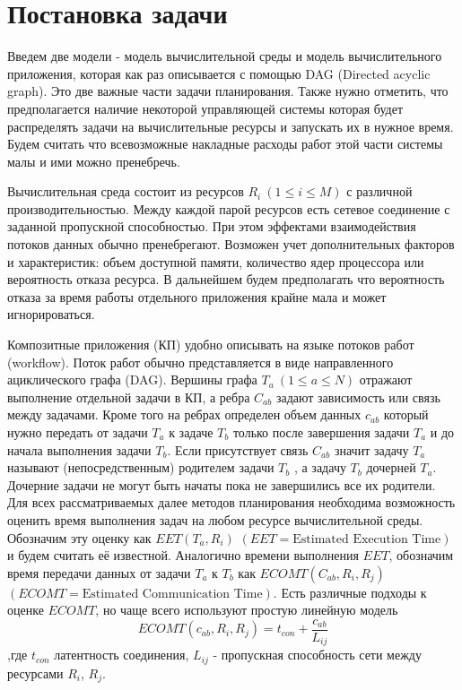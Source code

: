 \chapter*{Постановка задачи}
\begin{spacing}{1.4}

Введем две модели - модель вычислительной среды и модель вычислительного приложения, которая как раз описывается с помощью DAG (Directed acyclic graph). Это две важные части задачи планирования. Также нужно отметить, что предполагается наличие некоторой управляющей системы которая будет распределять задачи на вычислительные ресурсы и запускать их в нужное время. Будем считать что всевозможные накладные расходы работ этой части системы малы и ими можно пренебречь.

Вычислительная среда состоит из ресурсов $R_i~(1 \leq i \leq M)$ с различной производительностью. Между каждой парой ресурсов есть сетевое соединение с заданной пропускной способностью. При этом эффектами взаимодействия потоков данных обычно пренебрегают. Возможен учет дополнительных факторов и характеристик: объем доступной памяти, количество ядер процессора или вероятность отказа ресурса. В дальнейшем будем предполагать что вероятность отказа за время работы отдельного приложения крайне мала и может игнорироваться.

Композитные приложения (КП) удобно описывать на языке потоков работ (workflow). Поток работ обычно представляется в виде направленного ациклического графа (DAG). Вершины графа $T_a~(1 \leq a \leq N) $ отражают  выполнение отдельной задачи в КП, а ребра $C_{ab}$ задают зависимость или связь между задачами. Кроме того на ребрах определен объем данных $c_{ab}$ который нужно передать от задачи $T_a$  к задаче $T_b$ только после завершения задачи $T_a$ и до начала выполнения задачи $T_b$.  Если присутствует связь $C_{ab}$ значит задачу  $T_a$ называют (непосредственным) родителем задачи  $T_b$ , а задачу $T_b$ дочерней   $T_a$. Дочерние задачи не могут быть начаты пока не завершились все их родители. Для всех рассматриваемых далее методов планирования необходима возможность оценить время выполнения задач на любом ресурсе вычислительной среды. Обозначим эту оценку как $EET(T_a, R_i)$ $(EET = \text{Estimated Execution Time})$ и будем считать её известной. Аналогично времени выполнения $EET$, обозначим время передачи данных от задачи $T_a$ к $T_b$ как $ECOMT(C_{ab}, R_i, R_j)$ $(ECOMT = \text{Estimated Communication Time})$. Есть различные подходы к оценке $ECOMT$, но чаще всего используют простую линейную модель $$ECOMT (c_{ab}, R_i, R_j) = t_{con} + \frac{c_{ab}}{L_{ij}}$$
,где $t_{con}$ латентность соединения, $L_{ij}$ - пропускная способность сети между ресурсами $R_i$, $R_j$. 


\end{spacing}

